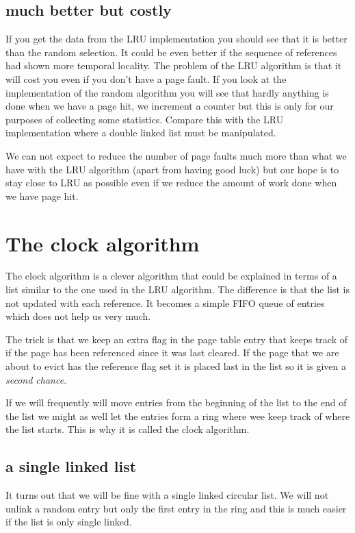 \documentclass[a4paper,11pt]{article}
\begin{document}
\subsection{much better but costly}

If you get the data from the LRU implementation you should see that it
is better than the random selection. It could be even better if the
sequence of references had shown more temporal locality. The problem
of the LRU algorithm is that it will cost you even if you don't have a
page fault. If you look at the implementation of the random algorithm
you will see that hardly anything is done when we have a page hit, we
increment a counter but this is only for our purposes of collecting
some statistics. Compare this with the LRU implementation where a
double linked list must be manipulated. 

We can not expect to reduce the number of page faults much more than
what we have with the LRU algorithm (apart from having good luck) but
our hope is to stay close to LRU as possible even if we reduce the
amount of work done when we have page hit.


\section{The clock algorithm}

The clock algorithm is a clever algorithm that could be explained
in terms of a list similar to the one used in the LRU algorithm. The
difference is that the list is not updated with each reference. It
becomes a simple FIFO queue of entries which does not help us very
much.

The trick is that we keep an extra flag in the page table entry that
keeps track of if the page has been referenced since it was last
cleared. If the page that we are about to evict has the reference flag
set it is placed last in the list so it is given a {\em second chance}. 

If we will frequently will move entries from the beginning of the list
to the end of the list we might as well let the entries form a ring
where wee keep track of where the list starts. This is why it is
called the clock algorithm.

\subsection{a single linked list}

It turns out that we will be fine with a single linked circular list.
We will not unlink a random entry but only the first entry in the
ring and this is much easier if the list is only single linked. 
\end{document}
